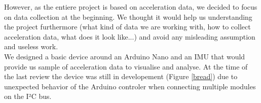 However, as the entiere project is based on acceleration data, we decided to focus on data collection at the beginning. We thought it would help us understanding the project furthermore (what kind of data we are working with, how to collect acceleration data, what does it look like...) and avoid any misleading assumption and useless work.\\
We designed a basic device around an Arduino Nano and an IMU that would provide us sample of acceleration data to visualise and analyse. At the time of the last review the device was still in developement (Figure \ref{bread}) due to unexpected behavior of the Arduino controler when connecting multiple modules on the I²C bus.